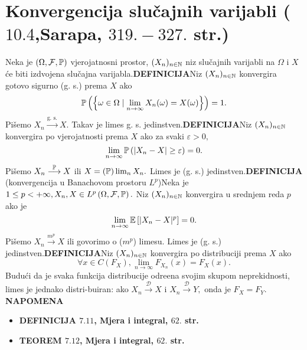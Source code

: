 \documentclass{article}
\begin{document}
\section{Konvergencija slučajnih varijabli (\textsection \(10.4\),Sarapa, \(319.-327.\) str.)}
Neka je \(\left(\Omega,\mathcal F,\Bbb P\right)\) vjerojatnosni prostor, \((X_n)_{n\in\Bbb N}\) niz slučajnih varijabli na \(\Omega\) i \(X\) će biti izdvojena slučajna varijabla.\newline\newline\textbf{DEFINICIJA}\newline Niz \((X_n)_{n\in\Bbb N}\) konvergira gotovo sigurno (g. s.) prema \(X\) ako \[\Bbb P\left(\left\{\omega\in\Omega\mid \lim_{n\to\infty}X_n(\omega)=X(\omega)\right\}\right)=1.\] Pišemo \(X_n\overset{\text{g. s.}}{\longrightarrow}X.\) Takav je limes g. s. jedinstven.\newline\newline\textbf{DEFINICIJA}\newline Niz \((X_n)_{n\in\Bbb N}\) konvergira po vjerojatnosti prema \(X\) ako za svaki \(\varepsilon>0,\) \[\lim_{n\to\infty}\Bbb P\left(|X_n-X|\ge\varepsilon\right)=0.\] Pišemo \(X_n\overset{\Bbb P}{\longrightarrow}X\) ili \(X=(\Bbb P)\lim_{n}X_n.\) Limes je (g. s.) jedinstven.\newline\newline\textbf{DEFINICIJA} (konvergencija u Banachovom prostoru \(L^p\))\newline Neka je \(1\le p<+\infty,X_n,X\in L^p\left(\Omega,\mathcal F,\Bbb P\right).\) Niz \((X_n)_{n\in\Bbb N}\) konvergira u srednjem reda \(p\) ako je \[\lim_{n\to\infty}\Bbb E\left[|X_n-X|^p\right]=0.\] Pišemo \(X_n\overset{m^p}{\longrightarrow}X\) ili govorimo o (\(m^p\)) limesu. Limes je (g. s.) jedinstven.\newline\newline\textbf{DEFINICIJA}\newline Niz \((X_n)_{n\in\Bbb N}\) konvergira po distribuciji prema \(X\) ako \[\forall x\in C({F_X}),\lim_{n\to\infty} F_{X_n}(x)=F_X(x).\]
Budući da je svaka funkcija distribucije odre\dj{}ena svojim skupom neprekidnosti, limes je jednako distri-\newline buiran: ako \(X_n\overset{\mathcal D}{\longrightarrow}X\) i \(X_n\overset{\mathcal D}{\longrightarrow}Y,\) onda je \(F_X=F_Y.\)\newline\newline
{}\textbf{NAPOMENA} 
\begin{itemize}
    \item[\ding{96}] \textbf{DEFINICIJA \(7.11\), Mjera i integral, \(62.\) str.}
    \item[\ding{96}] \textbf{TEOREM \(7.12\), Mjera i integral, \(62.\) str.}
    \end{itemize}
\end{document}
